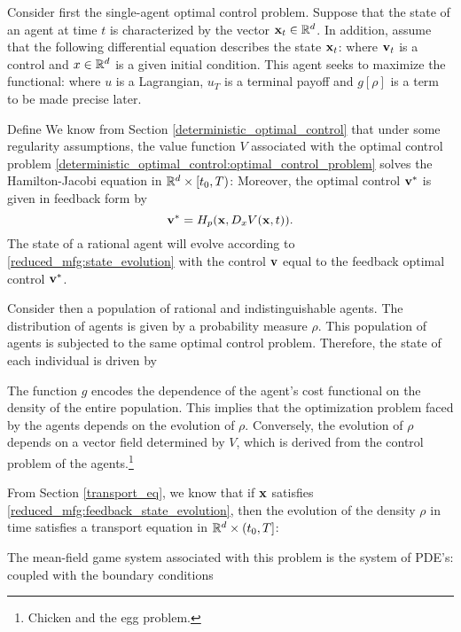 \documentclass{article}
\newcommand{\bx}[0]{{\bf x}}
\newcommand{\bv}[0]{{\bf v}}
\begin{document}
Consider first the single-agent optimal control problem. Suppose that the state of an agent at time $t$ is characterized by the vector $\bx_t \in \RR^d$. In addition, assume that the following differential equation describes the state $\bx_t$:
where $\bv_t$ is a control and $x\in\mathbb{R}^d$ is a given initial condition. This agent seeks to maximize the functional:
where $u$ is a Lagrangian, $u_T$ is a terminal payoff and $g[\rho]$ is a term to be made precise later. 

Define
We know from Section \eqref{deterministic_optimal_control} that under some regularity assumptions, the value function $V$ associated with the optimal control problem \eqref{deterministic_optimal_control:optimal_control_problem} 
solves the Hamilton-Jacobi equation in $\mathbb{R}^d \times [t_0,T)$:
Moreover, the optimal control $\bv^*$ is given in feedback form by
$$\bv^* = H_p(\bx, D_x V(\bx, t)).$$
The state of a rational agent will evolve according to \eqref{reduced_mfg:state_evolution} with the control $\bv$ equal to the feedback optimal control $\bv^*$.

Consider then a population of rational and indistinguishable agents. The distribution of agents is given by a probability measure $\rho$. This population of agents is subjected to the same optimal control problem. Therefore, the state of each individual is driven by

The function $g$ encodes the dependence of the agent's cost functional on the density of the entire population. This implies that the optimization problem faced by the agents depends on the evolution of $\rho$. Conversely, the evolution of $\rho$ depends on a vector field determined by $V$, which is derived from the control problem of the agents.\footnote{Chicken and the egg problem.}

From Section \eqref{transport_eq}, we know that if $\bx$ satisfies \eqref{reduced_mfg:feedback_state_evolution}, then the evolution of the density $\rho$ in time satisfies a transport equation in $\mathbb{R}^d \times (t_0, T]$:

The mean-field game system associated with this problem is the system of PDE's:
coupled with the boundary conditions
\end{document}
